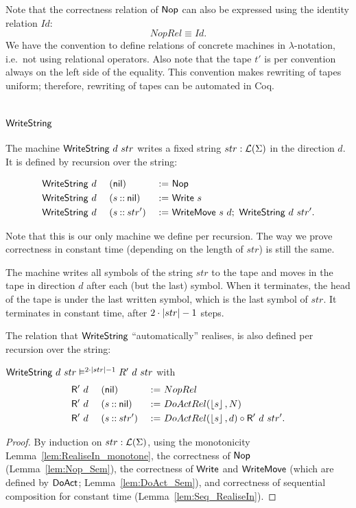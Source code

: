 Note that the correctness relation of $\mathsf{Nop}$ can also be expressed using the identity relation $Id$:
\[
  NopRel \equiv Id.
\]
We have the convention to define relations of concrete machines in $\lambda$-notation, i.e.\ not using relational operators.  Also note that
the tape $t'$ is per convention always on the left side of the equality.  This convention makes rewriting of tapes uniform; therefore, rewriting of
tapes can be automated in Coq.

\section{$\MS{WriteString}$}
\label{sec:WriteString}

The machine $\mathsf{WriteString}~d~str$ writes a fixed string $str:\mathcal{L}(\Sigma)$ in the direction $d$.  It is defined by recursion over the string:
\begin{definition}[$\MS{WriteString}$]
  \begin{alignat*}{3}
    &\mathsf{WriteString}~d~&&(\mathsf{nil})         &~:=~& \mathsf{Nop} \\
    &\mathsf{WriteString}~d~&&(s \mathbin{::} \mathsf{nil}) &~:=~& \mathsf{Write}~s \\
    &\mathsf{WriteString}~d~&&(s \mathbin{::} str') &~:=~& \mathsf{WriteMove}~s~d ;~ \mathsf{WriteString}~d~str'.
  \end{alignat*}
\end{definition}

Note that this is our only machine we define per recursion.  The way we prove correctness in constant time (depending on the length of $str$) is still
the same.

The machine writes all symbols of the string $str$ to the tape and moves in the tape in direction $d$ after each (but the last) symbol.  When it
terminates, the head of the tape is under the last written symbol, which is the last symbol of $str$.  It terminates in constant time, after
$2\cdot\left| str \right|-1$ steps.

The relation that $\MS{WriteString}$ ``automatically'' realises, is also defined per recursion over the string:
\begin{lemma}
  $\mathsf{WriteString}~d~str \mathrel{\vDash^{2 \cdot \left| str \right| - 1}} R'~d~str$ with
  \begin{alignat*}{3}
    &\mathsf{R'}~d~&&(\mathsf{nil}        ) &~:=~& NopRel \\
    &\mathsf{R'}~d~&&(s \mathbin{::} \mathsf{nil}) &~:=~& DoActRel(\left\lfloor {s} \right\rfloor, N) \\
    &\mathsf{R'}~d~&&(s \mathbin{::} str') &~:=~& DoActRel(\left\lfloor {s} \right\rfloor, d) \circ \mathsf{R'}~d~str'.
  \end{alignat*}
\end{lemma}
\begin{proof}
  By induction on $str:\mathcal{L}(\Sigma)$, using the monotonicity Lemma~\ref{lem:RealiseIn_monotone}, the correctness of $\mathsf{Nop}$ (Lemma~\ref{lem:Nop_Sem}),
  the correctness of $\mathsf{Write}$ and $\mathsf{WriteMove}$ (which are defined by $\mathsf{DoAct}$; Lemma~\ref{lem:DoAct_Sem}), and correctness of sequential
  composition for constant time (Lemma~\ref{lem:Seq_RealiseIn}).
\end{proof}


